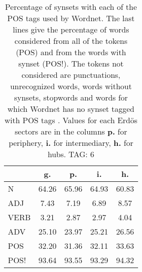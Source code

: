 \begin{table}[h!]
\begin{center}
\begin{tabular}{| l | c | c | c | c |}\hline
 & g. & p. & i. & h. \\\hline
N & 64.26  & 65.96  & 64.93  & 60.83 \\\hline
ADJ & 7.43  & 7.19  & 6.89  & 8.57 \\\hline
VERB & 3.21  & 2.87  & 2.97  & 4.04 \\\hline
ADV & 25.10  & 23.97  & 25.21  & 26.56 \\\hline
POS & 32.20  & 31.36  & 32.11  & 33.63 \\\hline
POS! & 93.64  & 93.55  & 93.29  & 94.32 \\\hline
\end{tabular}
\caption{Percentage of synsets with each of the POS tags used by Wordnet. The last lines give the percentage of words considered from all of the tokens (POS) and from the words with synset (POS!). The tokens not considered are punctuations, unrecognized words, words without synsets, stopwords and words for which Wordnet has no synset  tagged with POS tags . Values for each Erd\"os sectors are in the columns {{\bf p.}} for periphery, {{\bf i.}} for intermediary, {{\bf h.}} for hubs. TAG: 6}
\end{center}
\end{table}